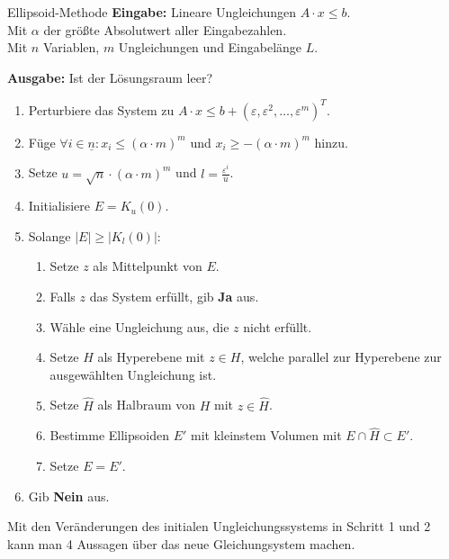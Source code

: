 \documentclass{panikzettel}
\begin{document}
\begin{algo}{Ellipsoid-Methode}
\textbf{Eingabe:} Lineare Ungleichungen $A \cdot x \leq b$.\\
Mit $\alpha$ der größte Absolutwert aller Eingabezahlen. \\
Mit $n$ Variablen, $m$ Ungleichungen und Eingabelänge $L$.

\textbf{Ausgabe:} Ist der Lösungsraum leer?
\tcblower

\begin{enumerate}
    \item Perturbiere das System zu $A \cdot x \leq b + (\varepsilon, \varepsilon^2, \dots ,\varepsilon^m)^T$.
    \item Füge $\forall i \in \underline{n} : x_i \leq (\alpha \cdot m)^m$ und $x_i\geq -(\alpha \cdot m)^m$ hinzu.
    \item Setze $u = \sqrt{n} \cdot (\alpha \cdot m)^m$ und $l = \frac{\varepsilon^i}{u}$.
    \item Initialisiere $E = K_u(0)$.
    \item Solange $|E| \geq |K_l(0)|$:
    \begin{enumerate}
        \item Setze $z$ als Mittelpunkt von $E$.
        \item Falls $z$ das System erfüllt, gib \textbf{Ja} aus.
        \item Wähle eine Ungleichung aus, die $z$ nicht erfüllt.
        \item Setze $H$ als Hyperebene mit $z \in H$, welche parallel zur Hyperebene zur ausgewählten Ungleichung ist.
        \item Setze $\hat{H}$ als Halbraum von $H$ mit $z \in \hat{H}$.
        \item Bestimme Ellipsoiden $E'$ mit kleinstem Volumen mit $E \cap \hat{H} \subset E'$.
        \item Setze $E = E'$.
    \end{enumerate}
    \item Gib \textbf{Nein} aus.
\end{enumerate}
\end{algo}

Mit den Veränderungen des initialen Ungleichungssystems in Schritt 1 und 2 kann man 4 Aussagen über das neue Gleichungsystem machen.
\end{document}
